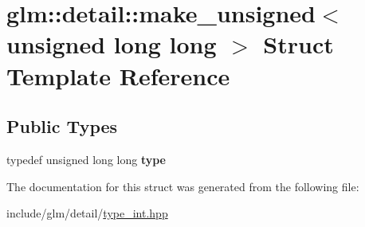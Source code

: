 \hypertarget{structglm_1_1detail_1_1make__unsigned_3_01unsigned_01long_01long_01_4}{}\section{glm\+:\+:detail\+:\+:make\+\_\+unsigned$<$ unsigned long long $>$ Struct Template Reference}
\label{structglm_1_1detail_1_1make__unsigned_3_01unsigned_01long_01long_01_4}
\subsection*{Public Types}
\begin{DoxyCompactItemize}
\item 
\mbox{\label{structglm_1_1detail_1_1make__unsigned_3_01unsigned_01long_01long_01_4_a3f3f1eb1cbdd286e6cb4afb5fa71d5c7}} 
typedef unsigned long long {\bfseries type}
\end{DoxyCompactItemize}


The documentation for this struct was generated from the following file\+:\begin{DoxyCompactItemize}
\item 
include/glm/detail/\hyperlink{type__int_8hpp}{type\+\_\+int.\+hpp}\end{DoxyCompactItemize}

